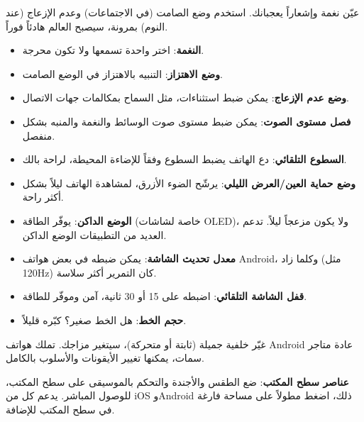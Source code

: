 


عيّن نغمة وإشعاراً يعجبانك. استخدم وضع الصامت (في الاجتماعات) وعدم الإزعاج (عند النوم) بمرونة، سيصبح العالم هادئاً فوراً.

\begin{itemize}
  \item \textbf{النغمة}: اختر واحدة تسمعها ولا تكون محرجة.
  \item \textbf{وضع الاهتزاز}: التنبيه بالاهتزاز في الوضع الصامت.
  \item \textbf{وضع عدم الإزعاج}: يمكن ضبط استثناءات، مثل السماح بمكالمات جهات الاتصال.
  \item \textbf{فصل مستوى الصوت}: يمكن ضبط مستوى صوت الوسائط والنغمة والمنبه بشكل منفصل.
\end{itemize}


\begin{itemize}
  \item \textbf{السطوع التلقائي}: دع الهاتف يضبط السطوع وفقاً للإضاءة المحيطة، لراحة بالك.
  \item \textbf{وضع حماية العين/العرض الليلي}: يرشّح الضوء الأزرق، لمشاهدة الهاتف ليلاً بشكل أكثر راحة.
  \item \textbf{الوضع الداكن}: يوفّر الطاقة (خاصة لشاشات OLED)، ولا يكون مزعجاً ليلاً. تدعم العديد من التطبيقات الوضع الداكن.
  \item \textbf{معدل تحديث الشاشة}: يمكن ضبطه في بعض هواتف Android، وكلما زاد (مثل 120Hz) كان التمرير أكثر سلاسة.
  \item \textbf{قفل الشاشة التلقائي}: اضبطه على 15 أو 30 ثانية، آمن وموفّر للطاقة.
  \item \textbf{حجم الخط}: هل الخط صغير؟ كبّره قليلاً.
\end{itemize}


غيّر خلفية جميلة (ثابتة أو متحركة)، سيتغير مزاجك. تملك هواتف Android عادة متاجر سمات، يمكنها تغيير الأيقونات والأسلوب بالكامل.

\textbf{عناصر سطح المكتب}: ضع الطقس والأجندة والتحكم بالموسيقى على سطح المكتب، للوصول المباشر. يدعم كل من iOS وAndroid ذلك، اضغط مطولاً على مساحة فارغة في سطح المكتب للإضافة.

